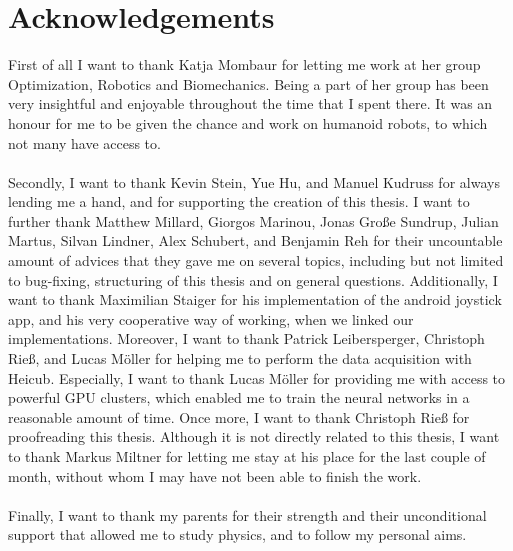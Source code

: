 \chapter{Acknowledgements}
First of all I want to thank Katja Mombaur for letting me work at her group Optimization, Robotics and Biomechanics. Being a part of her group has been very insightful and enjoyable throughout the time that I spent there. It was an honour for me to be given the chance and work on humanoid robots, to which not many have access to.\\\\
Secondly, I want to thank Kevin Stein, Yue Hu, and Manuel Kudruss for always lending me a hand, and for supporting the creation of this thesis. I want to further thank Matthew Millard, Giorgos Marinou, Jonas Große Sundrup, Julian Martus, Silvan Lindner, Alex Schubert, and Benjamin Reh for their uncountable amount of advices that they gave me on several topics, including but not limited to bug-fixing, structuring of this thesis and on general questions. Additionally, I want to thank Maximilian Staiger for his implementation of the android joystick app, and his very cooperative way of working, when we linked our implementations. Moreover, I want to thank Patrick Leibersperger, Christoph Rieß, and Lucas Möller for helping me to perform the data acquisition with Heicub. Especially, I want to thank Lucas Möller for providing me with access to powerful GPU clusters, which enabled me to train the neural networks in a reasonable amount of time. Once more, I want to thank Christoph Rieß for proofreading this thesis. Although it is not directly related to this thesis, I want to thank Markus Miltner for letting me stay at his place for the last couple of month, without whom I may have not been able to finish the work.\\\\
Finally, I want to thank my parents for their strength and their unconditional support that allowed me to study physics, and to follow my personal aims.
